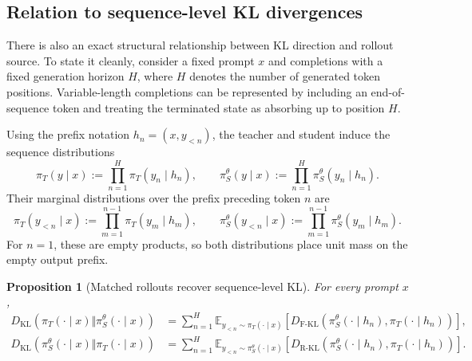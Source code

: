 \documentclass{article} %
\theoremstyle{plain}
\newtheorem{proposition}[theorem]{Proposition}
\theoremstyle{definition}
\theoremstyle{remark}
\begin{document}
\subsection{Relation to sequence-level KL divergences}
\label{app:sequence-level-kl}

There is also an exact structural relationship between KL direction and
rollout source.  To state it cleanly, consider a fixed prompt $x$ and
completions with a fixed generation horizon $H$, where $H$ denotes the number
of generated token positions.  Variable-length completions can be represented
by including an end-of-sequence token and treating the terminated state as
absorbing up to position $H$.

Using the prefix notation $h_n=(x,y_{<n})$, the teacher and student induce the
sequence distributions
\begin{equation}
    \pi_T(y\mid x)
    :=\prod_{n=1}^H\pi_T(y_n\mid h_n),
    \qquad
    \pi_S^\theta(y\mid x)
    :=\prod_{n=1}^H\pi_S^\theta(y_n\mid h_n).
    \label{eq:student-sequence-distribution}
\end{equation}
Their marginal distributions over the prefix preceding token $n$ are
\begin{equation}
    \pi_T(y_{<n}\mid x)
    :=\prod_{m=1}^{n-1}\pi_T(y_m\mid h_m),
     \qquad
    \pi_S^\theta(y_{<n}\mid x)
    :=\prod_{m=1}^{n-1}\pi_S^\theta(y_m\mid h_m).
    \label{eq:student-prefix-distribution}
\end{equation}
For $n=1$, these are empty products, so both distributions place unit mass on
the empty output prefix.

\begin{proposition}[Matched rollouts recover sequence-level KL]
\label{prop:sequence-chain-rule}
For every prompt $x$,
\begin{align}
D_{\mathrm{KL}}\!\left(\pi_T(\cdot\mid x)\Vert\pi_S^\theta(\cdot\mid x)\right)
&=
\sum_{n=1}^H
\mathbb E_{y_{<n}\sim\pi_T(\cdot\mid x)}
\!\left[
D_{\mathrm{F\text{-}KL}}\!\left(
\pi_S^\theta(\cdot\mid h_n),
\pi_T(\cdot\mid h_n)
\right)
\right],
\label{eq:sequence-forward-kl}\\
D_{\mathrm{KL}}\!\left(\pi_S^\theta(\cdot\mid x)\Vert\pi_T(\cdot\mid x)\right)
&=
\sum_{n=1}^H
\mathbb E_{y_{<n}\sim\pi_S^\theta(\cdot\mid x)}
\!\left[
D_{\mathrm{R\text{-}KL}}\!\left(
\pi_S^\theta(\cdot\mid h_n),
\pi_T(\cdot\mid h_n)
\right)
\right].
\label{eq:sequence-reverse-kl}
\end{align}
\end{proposition}
\end{document}
